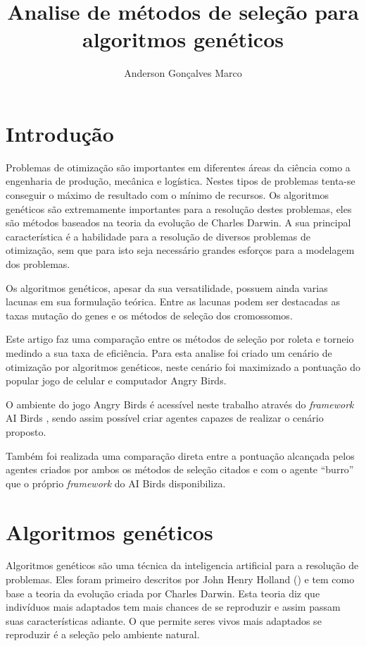 \documentclass[10pt,a4paper]{article}
\title{Analise de métodos de seleção para algoritmos genéticos}
\author{Anderson Gonçalves Marco}
\date{}
\begin{document}

\maketitle
\section{Introdução}
Problemas de otimização são importantes em diferentes áreas da ciência como a engenharia de produção, mecânica e logística. Nestes tipos de problemas tenta-se conseguir o máximo de resultado com o mínimo de recursos. Os algoritmos genéticos são extremamente importantes para  a resolução destes problemas, eles são métodos baseados na teoria da evolução de Charles Darwin. A sua principal característica é a habilidade para a resolução de diversos problemas de otimização, sem que para isto seja necessário grandes esforços para a modelagem dos problemas.

Os algoritmos genéticos, apesar da sua versatilidade, possuem ainda varias lacunas em sua formulação teórica. Entre as lacunas podem ser destacadas as taxas mutação do genes  e os métodos de seleção dos cromossomos.

Este artigo faz uma comparação entre os métodos de seleção por roleta e torneio medindo a sua taxa de eficiência. Para esta analise foi criado um cenário de otimização por algoritmos genéticos, neste cenário foi maximizado a pontuação do popular jogo de celular e computador Angry Birds. 

O ambiente do jogo Angry Birds é acessível neste trabalho através do \emph{framework} AI Birds \cite{aiBirds}, sendo assim possível criar agentes capazes de realizar o cenário proposto. 

Também foi realizada uma comparação direta entre a pontuação alcançada pelos agentes criados por ambos os métodos de seleção citados e com o agente ``burro'' que o próprio \emph{framework} do AI Birds disponibiliza.

\section{Algoritmos genéticos}
Algoritmos genéticos são uma técnica da inteligencia artificial para a resolução de problemas. Eles foram primeiro descritos por  John Henry Holland (\cite{primeiroAUsarAG}) e tem como  base a teoria da evolução criada por Charles Darwin. Esta teoria diz que indivíduos mais adaptados tem mais chances de se reproduzir e assim passam suas características adiante. O que permite seres vivos mais adaptados se reproduzir é a seleção pelo ambiente natural.
\end{document}

